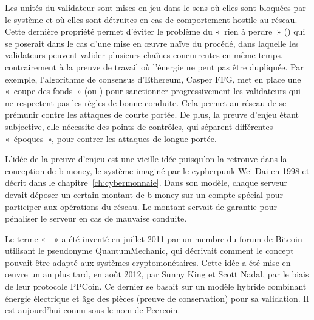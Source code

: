 Les unités du validateur sont mises en jeu dans le sens où elles sont bloquées par le système et où elles sont détruites en cas de comportement hostile au réseau. Cette dernière propriété permet d'éviter le problème du «~rien à perdre~» () qui se poserait dans le cas d'une mise en œuvre naïve du procédé, dans laquelle les validateurs peuvent valider plusieurs chaînes concurrentes en même temps, contrairement à la preuve de travail où l'énergie ne peut pas être dupliquée. Par exemple, l'algorithme de consensus d'Ethereum, Casper FFG, met en place une «~coupe des fonds~» (ou ) pour sanctionner progressivement les validateurs qui ne respectent pas les règles de bonne conduite. Cela permet au réseau de se prémunir contre les attaques de courte portée. De plus, la preuve d'enjeu étant subjective, elle nécessite des points de contrôles, qui séparent différentes «~époques~», pour contrer les attaques de longue portée.


L'idée de la preuve d'enjeu est une vieille idée puisqu'on la retrouve dans la conception de b-money, le système imaginé par le cypherpunk Wei Dai en 1998 et décrit dans le chapitre~\ref{ch:cybermonnaie}. Dans son modèle, chaque serveur devait déposer un certain montant de b-money sur un compte spécial pour participer aux opérations du réseau. Le montant servait de garantie pour pénaliser le serveur en cas de mauvaise conduite.

Le terme «~~» a été inventé en juillet 2011 par un membre du forum de Bitcoin utilisant le pseudonyme QuantumMechanic, qui décrivait comment le concept pouvait être adapté aux systèmes cryptomonétaires. Cette idée a été mise en œuvre un an plus tard, en août 2012, par Sunny King et Scott Nadal, par le biais de leur protocole PPCoin. Ce dernier se basait sur un modèle hybride combinant énergie électrique et âge des pièces (preuve de conservation) pour sa validation. Il est aujourd'hui connu sous le nom de Peercoin.


